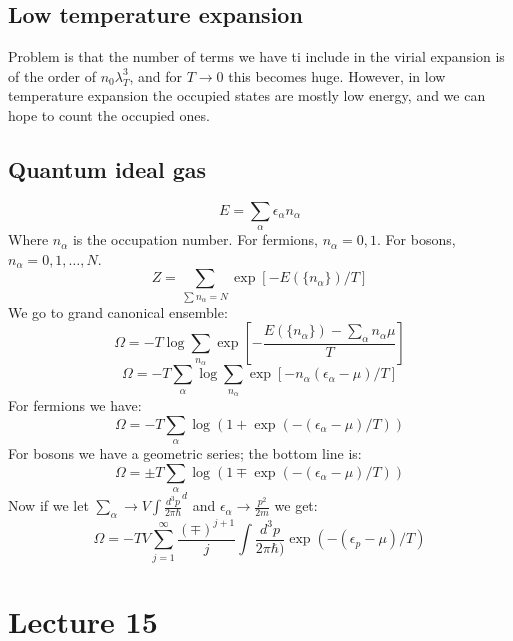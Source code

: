 \documentclass[12 pt]{article}
\begin{document}
\subsection*{Low temperature expansion}
Problem is that the number of terms we have ti include in the virial expansion is of the order of $n_0 \lambda_T^3$, and for $T\to 0$ this becomes huge. However, in low temperature expansion the occupied states are mostly low energy, and we can hope to count the occupied ones.

\subsection*{Quantum ideal gas}
\[      E = \sum_{\alpha} \epsilon_{\alpha} n_{\alpha}       \]
Where $n_{\alpha}$ is the occupation number. For fermions, $n_{\alpha} = 0,1$. For bosons, $n_{\alpha} = 0, 1, \dots, N$.
\[  Z = \sum_{\sum n_{\alpha}= N} \exp[   - E(\{n_{\alpha}\})/T  ]  \]
We go to grand canonical ensemble:
\[   \Omega = -T \log \sum_{n_{\alpha}} \exp \left[  - \frac{E(\{n_{\alpha}\}) - \sum_{\alpha} n_{\alpha} \mu}{T}  \right]   \]
\[    \Omega = -T \sum_{\alpha} \log \sum_{n_{\alpha}} \exp[ - n_{\alpha}(\epsilon_{\alpha} - \mu) /T  ]     \]
For fermions we have:
\[    \Omega = -T \sum_{\alpha} \log \left( 1 + \exp(-(\epsilon_{\alpha}- \mu)/T)  \right)     \]
For bosons we have a geometric series; the bottom line is:
\[         \Omega = \pm T \sum_{\alpha} \log \left( 1 \mp \exp(-(\epsilon_{\alpha}- \mu)/T)  \right)        \]
Now if we let $\sum_{\alpha} \to V \int \frac{d^3 p}{2\pi \hbar}^d$ and $\epsilon_{\alpha} \to \frac{p^2}{2m}$ we get:
\[   \Omega = - TV \sum_{j=1}^{\infty} \frac{(\mp)^{j+1}}{j} \int \frac{d^3 p}{2\pi \hbar)}  \exp ( - (\epsilon_p - \mu)/T)   \]


\section*{Lecture 15}
\end{document}
